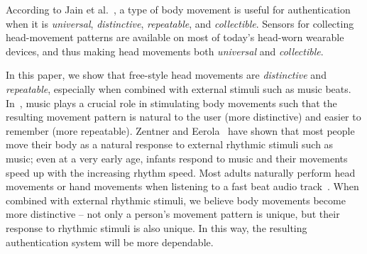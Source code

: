 
According to Jain et al.~\cite{jain2004introduction}, a type of body movement is useful for
authentication when it is \emph{universal}, \emph{distinctive},
\emph{repeatable}, and \emph{collectible}. %
Sensors for collecting head-movement patterns are
available on most of today's head-worn wearable devices, and thus
making head movements both {\em universal} and \emph{collectible}.

In this paper, we show that free-style head movements are  \emph{distinctive} and \emph{repeatable}, especially when combined with external stimuli such as music beats. In~\systemname, music plays a crucial role in stimulating body movements such that the resulting movement pattern is natural to the user (more distinctive) and easier to remember (more repeatable). Zentner and Eerola~\cite{zentner2010rhythmic} have shown that most people move
their body as a natural response to external rhythmic stimuli such as music;
even at a very early age, infants respond to music and their movements speed
up with the increasing rhythm speed. Most adults naturally perform head
movements or hand movements when listening to a fast beat audio track~\cite{action-sound:thesis}.  When
combined with external rhythmic stimuli, we believe body movements become more
distinctive -- not only a person's movement pattern is unique, but their
response to rhythmic stimuli is also unique. In this way, the resulting
authentication system will be more dependable.

